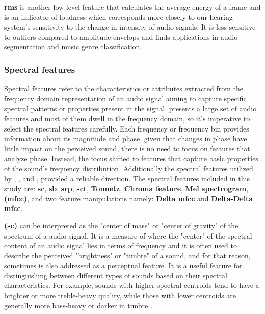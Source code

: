 \textbf{\gls{rms}} is another low level feature that calculates the average energy of a frame and is an indicator of loudness which corresponds more closely to our hearing system’s sensitivity to the change in intensity of audio signals. It is less sensitive to outliers compared to amplitude envelops and finds applications in audio segmentation and music genre classification. 


\subsubsection{Spectral features}
\label{subsubsec:spectral_fatures}

Spectral features refer to the characteristics or attributes extracted from the frequency domain representation of an audio signal aiming to capture specific spectral patterns or properties present in the signal. \textcite{Peeters2004} presents a large set of audio features and most of them dwell in the frequency domain, so it's imperative to select the spectral features carefully. Each frequency or frequency bin provides information about its magnitude and phase, given that changes in phase have little impact on the perceived sound, there is no need to focus on features that analyze phase. Instead, the focus shifted to features that capture basic properties of the sound's frequency distribution. Additionally the spectral features utilized by \textcite{Lhoest2021}, \textcite{Silva2019}, and \textcite{Bountourakis2015}, provided a reliable direction. The spectral features included in this study are: \textbf{\gls{sc}}, \textbf{\gls{sb}}, \textbf{\gls{srp}}, \textbf{\gls{sct}}, \textbf{Tonnetz}, \textbf{Chroma feature}, \textbf{Mel spectrogram}, \textbf{ (\gls{mfcc})}, and two feature manipulations namely: \textbf{Delta \gls{mfcc}} and \textbf{Delta-Delta \gls{mfcc}}.

\textbf{ (\gls{sc})} can be interpreted as the "center of mass" or "center of gravity" of the spectrum of a audio signal. It is a measure of where the "center" of the spectral content of an audio signal lies in terms of frequency and it is often used to describe the perceived "brightness" or "timbre" of a sound, and for that reason, sometimes is also addressed as a perceptual feature. It is a useful feature for distinguishing between different types of sounds based on their spectral characteristics. %
For example, sounds with higher spectral centroids tend to have a brighter or more treble-heavy quality, while those with lower centroids are generally more bass-heavy or darker in timbre \cite{Park2008}.

